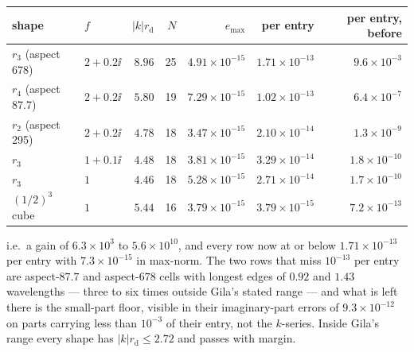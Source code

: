 \begin{center}\footnotesize
\begin{tabular}{@{}llrrrrr@{}}
\toprule
shape & $f$ & $|k|r_{\mathrm{d}}$ & $N$ & $e_{\max}$ & per entry & per entry, before\\
\midrule
$r_3$ (aspect 678) & $2+0.2\ii$ & $8.96$ & 25 & $4.91\times10^{-15}$ &
$1.71\times10^{-13}$ & $9.6\times10^{-3}$\\
$r_4$ (aspect 87.7) & $2+0.2\ii$ & $5.80$ & 19 & $7.29\times10^{-15}$ &
$1.02\times10^{-13}$ & $6.4\times10^{-7}$\\
$r_2$ (aspect 295) & $2+0.2\ii$ & $4.78$ & 18 & $3.47\times10^{-15}$ &
$2.10\times10^{-14}$ & $1.3\times10^{-9}$\\
$r_3$ & $1+0.1\ii$ & $4.48$ & 18 & $3.81\times10^{-15}$ & $3.29\times10^{-14}$ &
$1.8\times10^{-10}$\\
$r_3$ & $1$ & $4.46$ & 18 & $5.28\times10^{-15}$ & $2.71\times10^{-14}$ &
$1.7\times10^{-10}$\\
$(1/2)^3$ cube & $1$ & $5.44$ & 16 & $3.79\times10^{-15}$ & $3.79\times10^{-15}$ &
$7.2\times10^{-13}$\\
\bottomrule
\end{tabular}
\end{center}

\noindent
i.e.\ a gain of $6.3\times10^{3}$ to $5.6\times10^{10}$, and every row now at or below
$1.71\times10^{-13}$ per entry with $7.3\times10^{-15}$ in max-norm. The two rows that miss
$10^{-13}$ per entry are aspect-$87.7$ and aspect-$678$ cells with longest edges of $0.92$
and $1.43$ wavelengths --- three to six times outside Gila's stated range --- and what is
left there is the small-part floor, visible in their imaginary-part errors of
$9.3\times10^{-12}$ on parts carrying less than $10^{-3}$ of their entry, not the
$k$-series. Inside Gila's range every shape has $|k|r_{\mathrm{d}} \le 2.72$ and passes with
margin.

